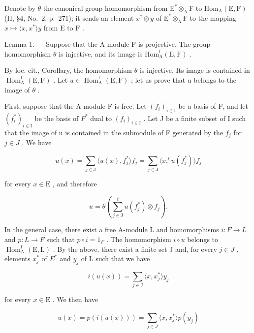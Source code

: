 Denote by \(\theta\) the canonical group homomorphism from \(\mathrm{E}^* \otimes_{\mathrm{A}} \mathrm{F}\) to \(\mathrm{Hom}_{\mathrm{A}}(\mathrm{E}, \mathrm{F})\) (II, §4, No.~2, p.~271); it sends an element \(x^* \otimes y\) of \(\mathrm{E}^* \otimes_{\mathrm{A}} \mathrm{F}\) to the mapping \(x \mapsto \langle x, x^* \rangle y\) from \(\mathrm{E}\) to \(\mathrm{F}\) .

Lemma 1. --- Suppose that the A-module F is projective. The group homomorphism \(\theta\) is injective, and its image is \(\mathrm{Hom}_{\mathrm{A}}^{\mathrm{f}}(\mathrm{E},\mathrm{F})\) .

By loc. cit., Corollary, the homomorphism \(\theta\) is injective. Its image is contained in \(\operatorname{Hom}_{\mathrm{A}}^{\mathrm{f}}(\mathrm{E},\mathrm{F})\) . Let \(u \in \operatorname{Hom}_{\mathrm{A}}^{\mathrm{f}}(\mathrm{E},\mathrm{F})\) ; let us prove that u belongs to the image of \(\theta\) .

First, suppose that the A-module F is free. Let \((f_{i})_{i\in\mathrm{I}}\) be a basis of F, and let \((f_{i}^{*})_{i\in\mathrm{I}}\) be the basis of \(F^{*}\) dual to \((f_{i})_{i\in\mathrm{I}}\) . Let J be a finite subset of I such that the image of u is contained in the submodule of F generated by the \(f_{j}\) for \(j\in J\) . We have

\[
u (x) = \sum_ {j \in \mathrm{J}} \langle u (x), f _ {j} ^ {*} \rangle f _ {j} = \sum_ {j \in \mathrm{J}} \langle x, ^ {t} u (f _ {j} ^ {*}) \rangle f _ {j}\tag{1}
\]

for every \(x\in \mathrm{E}\) , and therefore

\[
u = \theta \left(\sum_ {j \in \mathrm{J}} ^ {t} u \left(f _ {j} ^ {*}\right) \otimes f _ {j}\right).\tag{2}
\]

In the general case, there exist a free A-module L and homomorphisms \(i: F \to L\) and \(p: L \to F\) such that \(p \circ i = 1_{F}\) . The homomorphism \(i \circ u\) belongs to \(\operatorname{Hom}_{\mathrm{A}}^{\mathrm{f}}(\mathrm{E}, \mathrm{L})\) . By the above, there exist a finite set J and, for every \(j \in J\) , elements \(x_{j}^{*}\) of \(E^{*}\) and \(y_{j}\) of L such that we have

\[
i (u (x)) = \sum_ {j \in \mathrm{J}} \langle x, x _ {j} ^ {*} \rangle y _ {j}
\]

for every \(x \in \mathrm{E}\) . We then have

\[
u (x) = p \left(i (u (x))\right) = \sum_ {j \in J} \langle x, x _ {j} ^ {*} \rangle p \left(y _ {j}\right)
\]

